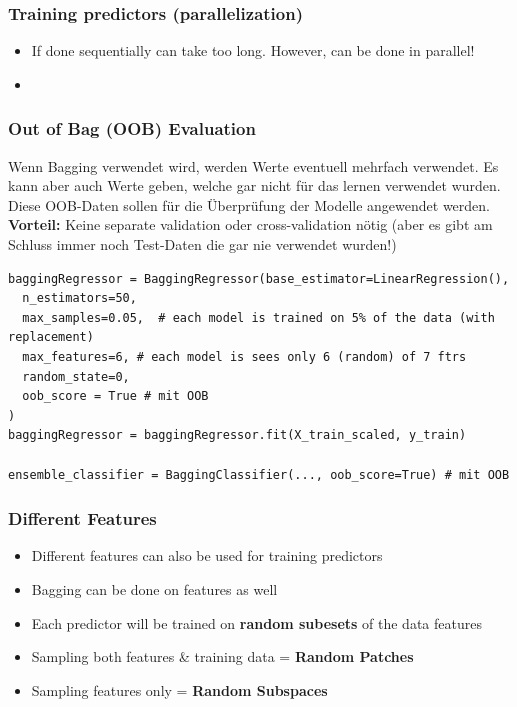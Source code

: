 \subsubsection{Training predictors (parallelization)}
\begin{itemize}
    \item If done sequentially can take too long. However, can be done in parallel!
    \item {}
\end{itemize}

\subsubsection{Out of Bag (OOB) Evaluation}
Wenn Bagging verwendet wird, werden Werte eventuell mehrfach verwendet. Es kann aber auch Werte geben, welche gar nicht für das lernen verwendet wurden. Diese OOB-Daten sollen für die Überprüfung der Modelle angewendet werden.\\
\textbf{Vorteil:} Keine separate validation oder cross-validation nötig (aber es gibt am Schluss immer noch Test-Daten die gar nie verwendet wurden!)\\ 
\begin{verbatim}
baggingRegressor = BaggingRegressor(base_estimator=LinearRegression(),
  n_estimators=50, 
  max_samples=0.05,  # each model is trained on 5% of the data (with replacement)
  max_features=6, # each model is sees only 6 (random) of 7 ftrs
  random_state=0, 
  oob_score = True # mit OOB
)
baggingRegressor = baggingRegressor.fit(X_train_scaled, y_train)

ensemble_classifier = BaggingClassifier(..., oob_score=True) # mit OOB
\end{verbatim}

\subsubsection{Different Features}
\begin{itemize}
    \item Different features can also be used for training predictors
    \item Bagging can be done on features as well
    \item Each predictor will be trained on  \textbf{random subesets} of the data features
    \item Sampling both features \& training data = \textbf{Random Patches}
    \item Sampling features only = \textbf{Random Subspaces}
\end{itemize}

